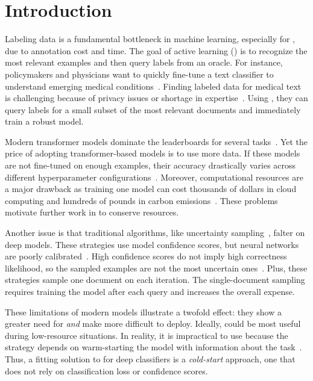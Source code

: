 \section{Introduction}

Labeling data is a fundamental bottleneck in machine learning, especially for
, due to annotation cost and time.  The goal of active learning
(\al{}) is to recognize the most relevant examples and then query labels from an oracle.
For instance, policymakers and physicians
want to quickly fine-tune a text classifier to understand emerging
medical conditions~\citep{voorhees-2020}. Finding labeled data for medical text
is challenging because of privacy issues or shortage in expertise~\citep{dernoncourt-2017}.
Using \al{}, they can query labels for a small subset of the most relevant documents
and immediately train a robust model.

Modern transformer models dominate the leaderboards for several
 tasks~\citep{devlin-2019,yang-2019}.
Yet the price of adopting transformer-based models is to use
more data.
If these models are not fine-tuned on enough examples,
their accuracy drastically varies across different hyperparameter
configurations~\citep{dodge-2020}.  Moreover, computational resources are a
major drawback as training one model can cost thousands of dollars in cloud
computing and hundreds of pounds in carbon emissions~\citep{strubell-2019}.
These problems motivate further work in  to conserve resources.

Another issue is that traditional \al{} algorithms,
like uncertainty sampling~\citep{lewis-1994}, falter on deep models.
These strategies use model confidence scores, but
 neural networks are poorly calibrated~\citep{guo-2017}. High confidence
 scores do not imply high correctness likelihood, so the sampled examples are
 not the most uncertain ones~\citep{zhang-2017}.  Plus, these
strategies sample one document on
each iteration. The single-document sampling requires training the model after
each query and
increases the overall
expense.

These limitations of modern  models
illustrate a twofold effect: they show a greater need for \al{} \textit{and} make
\al{} more difficult to deploy.
Ideally, \al{} could be most useful during low-resource
situations. In reality, it is impractical to use because the \al{} strategy depends
on warm-starting the model with information about the task~\citep{ash-2019}.
Thus, a fitting
solution to  for deep classifiers is a \emph{cold-start} approach, one
that does not rely on classification loss or confidence scores.

